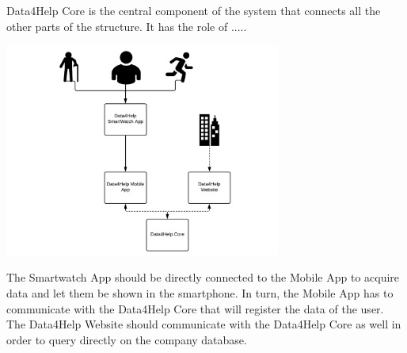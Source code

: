 Data4Help Core is the central component of the system that connects all the other parts of the structure.
It has the role of .....
\begin{center}
    \includegraphics[height=7cm]{assets/useflow.pdf}
\end{center}

The Smartwatch App should be directly connected to the Mobile App to acquire data and let them be shown in the smartphone. In turn, the Mobile App has to communicate with the Data4Help Core that will register the data of the user. The Data4Help Website should communicate with the Data4Help Core as well in order to query directly on the company database.